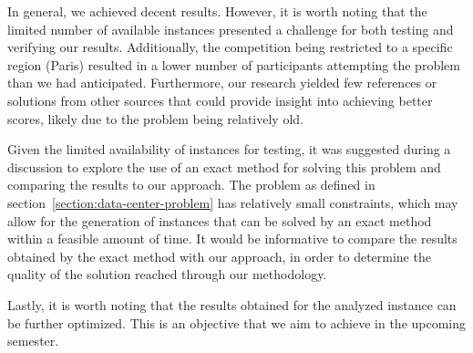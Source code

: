 In general, we achieved decent results. However, it is worth noting that the
limited number of available instances presented a challenge for both testing and
verifying our results. Additionally, the competition being restricted to a
specific region (Paris) resulted in a lower number of participants attempting
the problem than we had anticipated. Furthermore, our research yielded few
references or solutions from other sources that could provide insight into
achieving better scores, likely due to the problem being relatively old.

Given the limited availability of instances for testing, it was suggested
during a discussion to explore the use of an exact method for solving this
problem and comparing the results to our approach. The problem as defined in
section~\ref{section:data-center-problem} has relatively small constraints,
which may allow for the generation of instances that can be solved by an exact
method within a feasible amount of time. It would be informative to compare the
results obtained by the exact method with our approach, in order to determine
the quality of the solution reached through our methodology.

Lastly, it is worth noting that the results obtained for the analyzed instance
can be further optimized. This is an objective that we aim to achieve in the
upcoming semester.